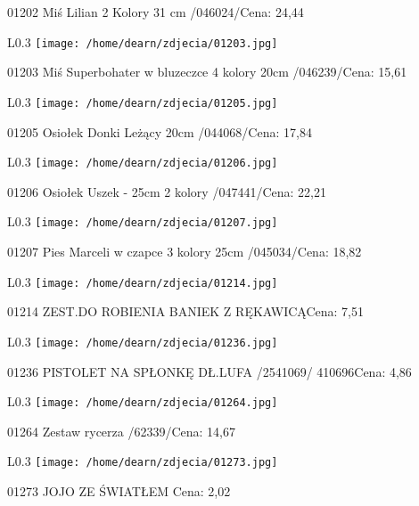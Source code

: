 01202 Miś Lilian 2 Kolory 31 cm /046024/Cena: 24,44\newline
\begin{wrapfigure}{L}{0.3\textwidth}
\texttt{[image: /home/dearn/zdjecia/01203.jpg]}
\end{wrapfigure}
01203 Miś Superbohater w bluzeczce 4 kolory 20cm /046239/Cena: 15,61\newline
\begin{wrapfigure}{L}{0.3\textwidth}
\texttt{[image: /home/dearn/zdjecia/01205.jpg]}
\end{wrapfigure}
01205 Osiołek Donki Leżący 20cm /044068/Cena: 17,84\newline
\begin{wrapfigure}{L}{0.3\textwidth}
\texttt{[image: /home/dearn/zdjecia/01206.jpg]}
\end{wrapfigure}
01206 Osiołek Uszek - 25cm 2 kolory /047441/Cena: 22,21\newline
\begin{wrapfigure}{L}{0.3\textwidth}
\texttt{[image: /home/dearn/zdjecia/01207.jpg]}
\end{wrapfigure}
01207 Pies Marceli w czapce 3 kolory 25cm /045034/Cena: 18,82\newline
\begin{wrapfigure}{L}{0.3\textwidth}
\texttt{[image: /home/dearn/zdjecia/01214.jpg]}
\end{wrapfigure}
01214 ZEST.DO ROBIENIA BANIEK Z RĘKAWICĄCena: 7,51\newline
\begin{wrapfigure}{L}{0.3\textwidth}
\texttt{[image: /home/dearn/zdjecia/01236.jpg]}
\end{wrapfigure}
01236 PISTOLET NA SPŁONKĘ DŁ.LUFA /2541069/           410696Cena: 4,86\newline
\begin{wrapfigure}{L}{0.3\textwidth}
\texttt{[image: /home/dearn/zdjecia/01264.jpg]}
\end{wrapfigure}
01264 Zestaw rycerza /62339/Cena: 14,67\newline
\begin{wrapfigure}{L}{0.3\textwidth}
\texttt{[image: /home/dearn/zdjecia/01273.jpg]}
\end{wrapfigure}
01273 JOJO ZE ŚWIATŁEM Cena: 2,02\newline
